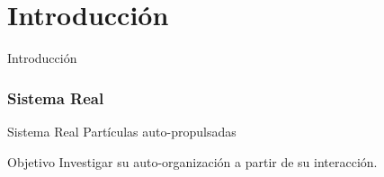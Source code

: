 \section{Introducción}

{
\begin{frame}
    \centering
  \Huge
  Introducción
\end{frame}
}

% 
\begin{frame}

\frametitle{Sistema Real}
\begin{block}{Sistema Real}
Partículas auto-propulsadas
\end{block}

\begin{alertblock}{Objetivo}
Investigar su auto-organización a partir de su interacción.
\end{alertblock}

\end{frame}

